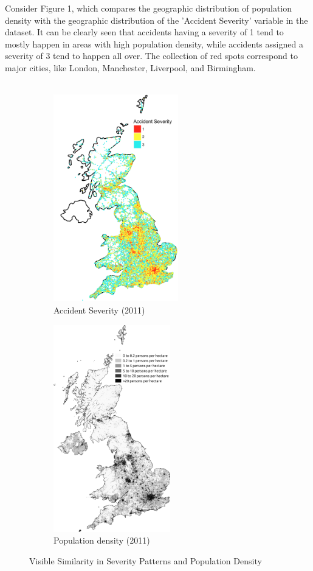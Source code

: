 \documentclass[a4paper, 11pt]{article}
\begin{document}
Consider Figure 1, which compares the geographic distribution of population density with the geographic distribution of the 'Accident Severity' variable in the dataset. It can be clearly seen that accidents having a severity of 1 tend to mostly happen in areas with high population density, while accidents assigned a severity of 3 tend to happen all over. The collection of red spots correspond to major cities, like London, Manchester, Liverpool, and Birmingham. \\ \\

\begin{figure}[H]
\begin{subfigure}[H]{0.4\linewidth}
\includegraphics[height=9cm,keepaspectratio]{Severity_Map.png}
\caption{Accident Severity (2011)}
\end{subfigure}
\hfill
\begin{subfigure}[H]{0.4\linewidth}
\includegraphics[height=9cm,keepaspectratio]{Population_density.png}
\caption{Population density (2011)}
\end{subfigure}%
\caption{Visible Similarity in Severity Patterns and Population Density}
\end{figure}
\end{document}

